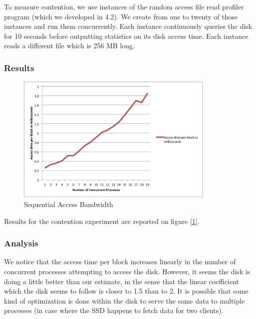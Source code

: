 To measure contention, we use instances of the random access file read profiler program (which we developed in 4.2). We create from one to twenty of those instances and run them concurrently. Each instance continuously queries the disk for 10 seconds before outputting statistics on its disk access time. Each instance reads a different file which is 256 MB long. 

\subsubsection{Results}

\begin{figure}
 \centering
  \includegraphics[width=0.85\textwidth]{image/contention.png}
  \caption{Sequential Access Bandwidth}
 \label{fig:contention}
\end{figure}

Results for the contention experiment are reported on figure [\ref{fig:contention}].

\subsubsection{Analysis}

We notice that the access time per block increases linearly in the number of concurrent processes attempting to access the disk. However, it seems the disk is doing a little better than our estimate, in the sense that the linear coefficient which the disk seems to follow is closer to 1.5 than to 2. It is possible that some kind of optimization is done within the disk to serve the same data to multiple processes (in case where the SSD happens to fetch data for two clients). 